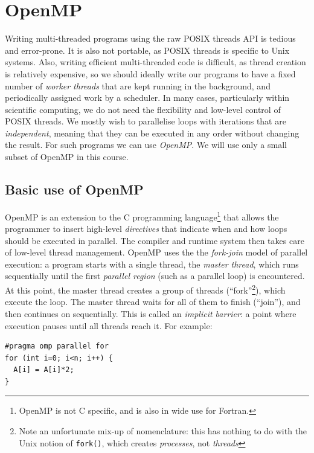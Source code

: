 \lstset{language=C}

\chapter{OpenMP}
\label{chap:openmp}

Writing multi-threaded programs using the raw POSIX threads API is
tedious and error-prone.  It is also not portable, as POSIX threads is
specific to Unix systems.  Also, writing efficient multi-threaded code
is difficult, as thread creation is relatively expensive, so we should
ideally write our programs to have a fixed number of \emph{worker
  threads} that are kept running in the background, and periodically
assigned work by a scheduler.  In many cases, particularly within
scientific computing, we do not need the flexibility and low-level
control of POSIX threads.  We mostly wish to parallelise loops with
iterations that are \emph{independent}, meaning that they can be
executed in any order without changing the result.  For such programs
we can use \emph{OpenMP}.  We will use only a small subset of OpenMP
in this course.

\section{Basic use of OpenMP}

OpenMP is an extension to the C programming language\footnote{OpenMP
  is not C specific, and is also in wide use for Fortran.} that allows
the programmer to insert high-level \emph{directives} that indicate
when and how loops should be executed in parallel.  The compiler and
runtime system then takes care of low-level thread management.  OpenMP
uses the the \emph{fork-join} model of parallel execution: a program
starts with a single thread, the \emph{master thread}, which runs
sequentially until the first \emph{parallel region} (such as a
parallel loop) is encountered.  At this point, the master thread
creates a group of threads (``fork''\footnote{Note an unfortunate
  mix-up of nomenclature: this has nothing to do with the Unix notion
  of \texttt{fork()}, which creates \emph{processes}, not
  \emph{threads}}), which execute the loop.  The master thread waits
for all of them to finish (``join''), and then continues on
sequentially.  This is called an \textit{implicit barrier}: a point
where execution pauses until all threads reach it.  For example:

\begin{lstlisting}[mathescape=true]
#pragma omp parallel for
for (int i=0; i<n; i++) {
  A[i] = A[i]*2;
}
\end{lstlisting}


